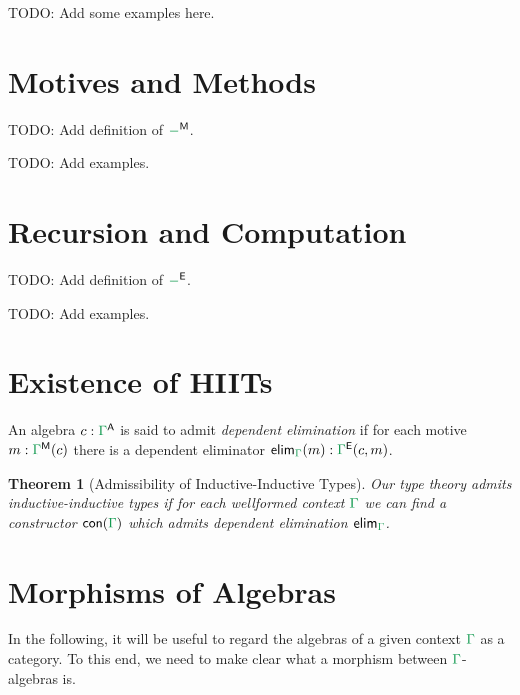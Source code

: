 \documentclass[12pt,headings=optiontohead,openany,oneside,a4paper]{book}
\newtheorem{thm}{Theorem}[section]
\theoremstyle{definition}
\newcommand{\gr}[1]{{\color{ForestGreen}#1}}
\newcommand{\grm}[1]{\ensuremath{\gr{#1}}}
\newcommand{\CC}{\mathsf{A}} %
\newcommand{\EE}{\mathsf{E}}
\newcommand{\MM}{\mathsf{M}}
\newcommand{\con}[1]{\mathsf{con}(\grm{#1})}
\newcommand{\elim}{\mathsf{elim}}
\begin{document}
TODO: Add some examples here.

\section{Motives and Methods}

TODO: Add definition of $\grm{-}^\MM$.

TODO: Add examples.

\section{Recursion and Computation}

TODO: Add definition of $\grm{-}^\EE$.

TODO: Add examples.

\section{Existence of HIITs}

\begin{defn}
An algebra $c : \grm{\Gamma}^\CC$ is said to admit \emph{dependent elimination}
if for each motive $m : \grm{\Gamma}^\MM(c)$ there is a dependent eliminator
$\elim_{\grm{\Gamma}}(m) : \grm{\Gamma}^\EE(c, m)$.
\end{defn}

\begin{thm}[Admissibility of Inductive-Inductive Types]
Our type theory admits inductive-inductive types if for each wellformed context
$\grm{\Gamma}$ we can find a constructor $\con{\grm{\Gamma}}$ which admits dependent
elimination $\elim_{\grm{\Gamma}}$.
\end{thm}

\section{Morphisms of Algebras}

In the following, it will be useful to regard the algebras of a given context
\grm{\Gamma} as a category.
To this end, we need to make clear what a morphism between \grm{\Gamma}-algebras
is.
\end{document}
